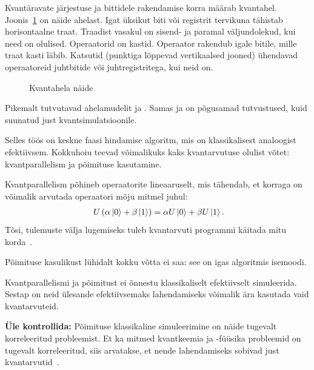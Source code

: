 \documentclass[12pt]{report}
\def\paren#1{\left(#1\right)}
\def\ket#1{\mathinner{|#1\rangle}}
\begin{document}
Kvantäravate järjestuse ja bittidele rakendamise korra määrab kvantahel.
Joonis~\ref{fig:circuits} on näide ahelast. Igat üksikut biti või registrit
tervikuna tähistab horisontaalne traat. Traadist vasakul on sisend- ja paramal
väljundolekud, kui need on olulised. Operaatorid on kastid. Operaator rakendub
igale bitile, mille traat kasti läbib. Katsutid (punktiga lõppevad vertikaalsed
jooned) ühendavad operaatoreid juhtbitide või juhtregistritega, kui neid on.

\begin{figure}
    \centering
    \ifdefined\yquanton
    \fi
    \caption{Kvantahela näide}
    \label{fig:circuits}
\end{figure}

Pikemalt tutvutavad ahelamudelit \cite{nielsen+chuang} ja
\cite{kaye+laflamme+mosca}. Samas \cite{cao+etal} ja \cite{mcardle+etal} on
põgusamad tutvustused, kuid suunatud just kvantsimulatsioonile.

Selles töös on keskne faasi hindamise algoritm, mis on klassikalisest analoogist efektiivsem.
Kokkuhoiu teevad võimalikuks kaks kvantarvutuse olulist võtet: kvantparallelism ja põimituse kasutamine.

Kvantparallelism põhineb operaatorite lineaaruselt, mis tähendab, et korraga on võimalik arvutada operaatori mõju mitmel juhul:
\begin{align}
    U \paren{\alpha\ket{0} + \beta\ket{1}}
    = \alpha U \ket{0} + \beta U \ket{1} \rlap{.}
\end{align}
Tõsi, tulemuste välja lugemiseks tuleb kvantarvuti programmi käitada mitu korda~\cite{mcardle+etal}.

Põimituse kasulikust lühidalt kokku võtta ei saa: see on igas algoritmis isemoodi.

Kvantparallelismi ja põimitust ei õnnestu klassikaliselt efektiivselt simuleerida.
Sestap on neid ülesande efektiivsemaks lahendamiseks võimalik ära kasutada vaid kvantarvuteid.

\textbf{Üle kontrollida:} Põimituse klassikaline simuleerimine on näide tugevalt korreleeritud probleemist.
Et ka mitmed kvantkeemia ja -füüsika probleemid on tugevalt korreleeritud, siis arvatakse, et nende lahendamiseks sobivad just kvantarvutid~\cite{cao+etal}.
\end{document}
